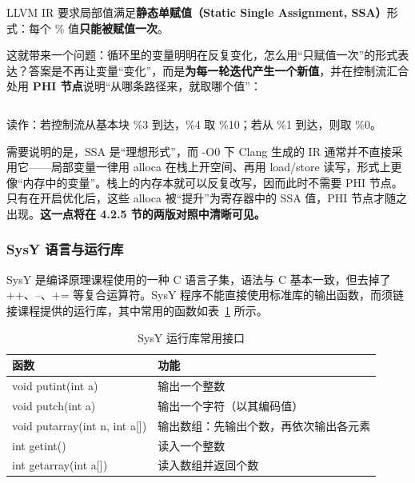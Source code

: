 \documentclass[UTF8,a4paper,10pt]{ctexart}
\newcommand{\headcol}{\bfseries}
\begin{document}
LLVM IR 要求局部值满足\textbf{静态单赋值（Static Single Assignment, SSA）}形式：每个 \% 值\textbf{只能被赋值一次}。

这就带来一个问题：循环里的变量明明在反复变化，怎么用“只赋值一次”的形式表达？答案是不再让变量“变化”，而是\textbf{为每一轮迭代产生一个新值}，并在控制流汇合处用 \textbf{PHI 节点}说明“从哪条路径来，就取哪个值”：

\begin{lstlisting}[language=LLVM]
%4 = phi i32 [ %10, %3 ], [ %0, %1 ]
\end{lstlisting}

读作：若控制流从基本块 \%3 到达，\%4 取 \%10；若从 \%1 到达，则取 \%0。

需要说明的是，SSA 是“理想形式”，而 -O0 下 Clang 生成的 IR 通常并不直接采用它——局部变量一律用 alloca 在栈上开空间、再用 load/store 读写，形式上更像“内存中的变量”。栈上的内存本就可以反复改写，因而此时不需要 PHI 节点。只有在开启优化后，这些 alloca 被“提升”为寄存器中的 SSA 值，PHI 节点才随之出现。\textbf{这一点将在 4.2.5 节的两版对照中清晰可见。}

\subsubsection{SysY 语言与运行库}

SysY 是编译原理课程使用的一种 C 语言子集，语法与 C 基本一致，但去掉了 ++、--、+= 等复合运算符。SysY 程序不能直接使用标准库的输出函数，而须链接课程提供的运行库，其中常用的函数如表~\ref{tab:sylibapi} 所示。

\begin{table}[H]
  \centering
  \small
  \setlength{\tabcolsep}{4pt}
  \begin{tabular}{>{\centering\arraybackslash}p{5.2cm}>{\centering\arraybackslash}p{8.8cm}}
    \toprule
\headcol 函数 & \headcol 功能 \\
    \midrule
void putint(int a) & 输出一个整数 \\
    void putch(int a) & 输出一个字符（以其编码值） \\
    void putarray(int n, int a[]) & 输出数组：先输出个数，再依次输出各元素 \\
    int getint() & 读入一个整数 \\
    int getarray(int a[]) & 读入数组并返回个数 \\
    \bottomrule
\end{tabular}
  \caption{SysY 运行库常用接口}
  \label{tab:sylibapi}
\end{table}
\end{document}
